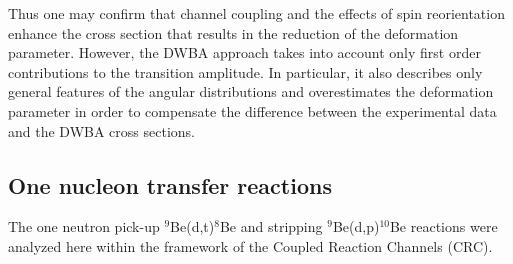 \documentclass[10pt]{iopart}
\begin{document}
Thus one may confirm that channel coupling and the effects of spin reorientation enhance the cross section that results in the reduction of the deformation parameter. However, the DWBA approach takes into account only first order contributions to the transition amplitude. In particular, it also describes only general features of the angular distributions and overestimates the deformation parameter in order to compensate the difference between the experimental data and the DWBA cross sections.



\subsection{One nucleon transfer reactions }
The one neutron pick-up ${}^9$Be(d,t)${}^8$Be and stripping ${}^9$Be(d,p)${}^{10}$Be reactions were analyzed here within the framework of  the Coupled Reaction Channels (CRC).
\end{document}
